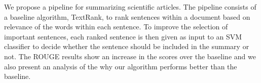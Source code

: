 We propose a pipeline for summarizing scientific articles.
The pipeline consists of a baseline algorithm, TextRank, to rank sentences within a document based on relevance of the words within each sentence.
To improve the selection of important sentences, each ranked sentence is then given as input to an SVM classifier to decide whether the sentence should be included in the summary or not.
The ROUGE results show an increase in the scores over the baseline and we also present an analysis of the why our algorithm performs better than the baseline.